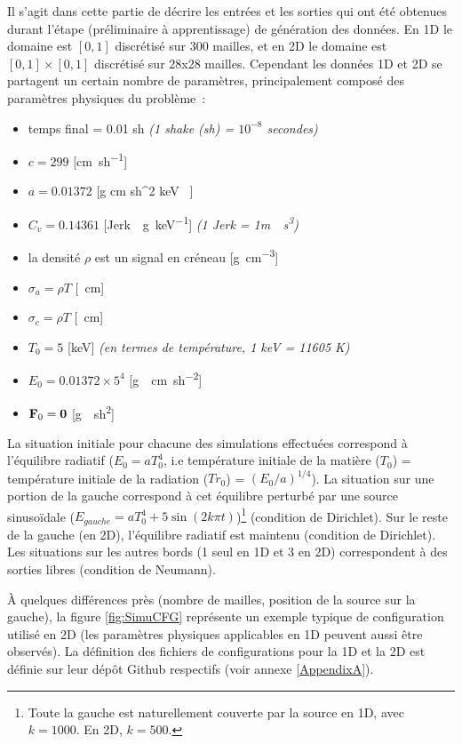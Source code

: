 Il s'agit dans cette partie de décrire les entrées et les sorties qui ont été obtenues durant l'étape (préliminaire à apprentissage) de génération des données. En 1D le domaine est $[0,1]$ discrétisé sur 300 mailles, et en 2D le domaine est $[0,1] \times [0,1]$ discrétisé sur 28x28 mailles. Cependant les données 1D et 2D se partagent un certain nombre de paramètres, principalement composé des paramètres physiques du problème :
\begin{itemize}
  \item temps final = 0.01 \si{sh} \textit{(1 shake (\si{sh}) = $10^{-8}$ secondes)}
  \item $c = 299$ [\si{\cm \per sh}]
  \item $a = 0.01372$ [\si{g \per cm \per sh^2  \per keV }]
  \item $C_v = 0.14361$ [\si{Jerk \per\g \per keV}] \textit{(1 \si{Jerk} = 1\si{m \per \s\cubed})}
  \item la densité $\rho$ est un signal en créneau [\si{\g\per\cm\cubed}]
  \item $\sigma_a = \rho T$ [\si{\per\cm}]
  \item $\sigma_c = \rho T$ [\si{\per\cm}]
  \item $T_0 = 5$ [\si{keV}] \textit{(en termes de température, 1 \si{keV} = 11605 \si{K})}
  \item $E_0 = 0.01372\times 5^4$ [\si{g \per \cm \per sh^2}]
  \item $\mathbf{F}_0 = \mathbf{0}$ [\si{g \per sh^2}]
\end{itemize}

La situation initiale pour chacune des simulations effectuées correspond à l'équilibre radiatif ($E_0=aT_0^4$, i.e température initiale de la matière ($T_0$) = température initiale de la radiation ($Tr_0$) = $(E_0/a)^{1/4}$). La situation sur une portion de la gauche correspond à cet équilibre perturbé par une source sinusoïdale ($ E_{gauche} = aT_{0}^4 + 5 \sin (2 k \pi t) $)\footnote{Toute la gauche est naturellement couverte par la source en 1D, avec $k=1000$. En 2D, $k=500$.} (condition de Dirichlet). Sur le reste de la gauche (en 2D), l'équilibre radiatif est maintenu (condition de Dirichlet). Les situations sur les autres bords (1 seul en 1D et 3 en 2D) correspondent à des sorties libres (condition de Neumann).

À quelques différences près (nombre de mailles, position de la source sur la gauche), la figure \ref{fig:SimuCFG} représente un exemple typique de configuration utilisé en 2D (les paramètres physiques applicables en 1D peuvent aussi être observés). La définition des fichiers de configurations pour la 1D et la 2D est définie sur leur dépôt Github respectifs (voir annexe \ref{AppendixA}).


